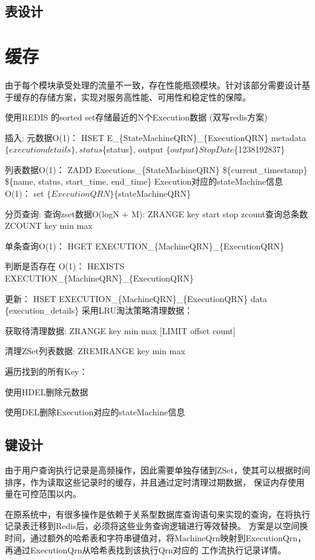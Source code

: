 \subsection{表设计}

\section{缓存}
由于每个模块承受处理的流量不一致，存在性能瓶颈模块。针对该部分需要设计基于缓存的存储方案，实现对服务高性能、可用性和稳定性的保障。



使用REDIS 的sorted set存储最近的N个Execution数据 (双写redis方案)

插入:
元数据O(1)：
HSET E\_\{StateMachineQRN\}\_\{ExecutionQRN\} metadata $\{execution details\}, status $\{status\}, output $\{output\} StopDate $\{1238192837\}

列表数据O(1)：
ZADD Executions\_\{StateMachineQRN\} \$\{current\_timestamp\} \$\{name, status, start\_time, end\_time\}
Execution对应的stateMachine信息 O(1)：
set $\{ExecutionQRN\} $\{stateMachineQRN\}

分页查询:
查询zset数据O(logN + M): ZRANGE key start stop
zcount查询总条数 ZCOUNT key min max

单条查询O(1)：
HGET  EXECUTION\_\{MachineQRN\}\_\{ExecutionQRN\}

判断是否存在 O(1)：
HEXISTS EXECUTION\_\{MachineQRN\}\_\{ExecutionQRN\}

更新：
HSET EXECUTION\_\{MachineQRN\}\_\{ExecutionQRN\} data \{execution\_details\}
采用LRU淘汰策略清理数据：

获取待清理数据: ZRANGE key min max [LIMIT offset count]

清理ZSet列表数据: ZREMRANGE key min max

遍历找到的所有Key：

使用HDEL删除元数据

使用DEL删除Execution对应的stateMachine信息



\subsection{键设计}
由于用户查询执行记录是高频操作，因此需要单独存储到ZSet，使其可以根据时间排序，作为读取这些记录时的缓存，并且通过定时清理过期数据，
保证内存使用量在可控范围以内\cite{zw7}。

在原系统中，有很多操作是依赖于关系型数据库查询语句来实现的查询，在将执行记录表迁移到Redis后，必须将这些业务查询逻辑进行等效替换。
方案是以空间换时间，通过额外的哈希表和字符串键值对，将MachineQrn映射到ExecutionQrn，再通过ExecutionQrn从哈希表找到该执行Qrn对应的
工作流执行记录详情\cite{zw6}。


